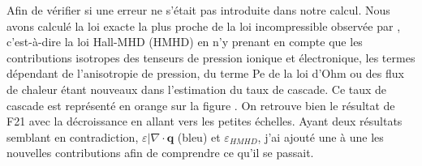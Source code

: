 Afin de vérifier si une erreur ne s'était pas introduite dans notre calcul. Nous avons calculé la loi exacte la plus proche de la loi incompressible observée par \cite{ferrand_fluid_2021}, c'est-à-dire la loi Hall-MHD (HMHD) en n'y prenant en compte que les contributions isotropes des tenseurs de pression ionique et électronique, les termes dépendant de l'anisotropie de pression, du terme \acs{Pe} de la loi d'Ohm ou des flux de chaleur étant nouveaux dans l'estimation du taux de cascade. Ce taux de cascade est représenté en orange sur la figure . On retrouve bien le résultat de \ac{F21} avec la décroissance en allant vers les petites échelles. Ayant deux résultats semblant en contradiction, $\varepsilon|\nabla \cdot \boldsymbol{q}$ (bleu) et $\varepsilon_{HMHD}$, j'ai ajouté une à une les nouvelles contributions afin de comprendre ce qu'il se passait. 

